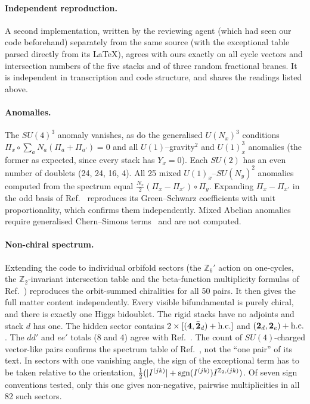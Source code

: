 \documentclass[aps,prd,twocolumn,superscriptaddress,nofootinbib,showkeys]{revtex4-2}
\begin{document}
\paragraph{Independent reproduction.} A second implementation, written by the reviewing agent (which had seen our code beforehand) separately from the same source (with the exceptional table parsed directly from its \LaTeX), agrees with ours exactly on all cycle vectors and intersection numbers of the five stacks and of three random fractional branes. It is independent in transcription and code structure, and shares the readings listed above.

\paragraph{Anomalies.} The $SU(4)^3$ anomaly vanishes, as do the generalised $U(N_x)^3$ conditions $\Pi_x\circ\sum_aN_a(\Pi_a+\Pi_{a'})=0$ and all $U(1)$--gravity$^2$ and $U(1)_x^3$ anomalies (the former as expected, since every stack has $Y_x=0$). Each $SU(2)$ has an even number of doublets (24, 24, 16, 4). All 25 mixed $U(1)_x$--$SU(N_y)^2$ anomalies computed from the spectrum equal $\tfrac{N_x}{2}(\Pi_x-\Pi_{x'})\circ\Pi_y$. Expanding $\Pi_x-\Pi_{x'}$ in the odd basis of Ref.~\cite{HRS} reproduces its Green--Schwarz coefficients with unit proportionality, which confirms them independently. Mixed Abelian anomalies require generalised Chern--Simons terms~\cite{ABDK} and are not computed.

\paragraph{Non-chiral spectrum.} Extending the code to individual orbifold sectors (the $\mathbb Z_6'$ action on one-cycles, the $\mathbb Z_2$-invariant intersection table and the beta-function multiplicity formulas of Ref.~\cite{HRS}) reproduces the orbit-summed chiralities for all 50 pairs. It then gives the full matter content independently. Every visible bifundamental is purely chiral, and there is exactly one Higgs bidoublet. The rigid stacks have no adjoints and stack $d$ has one. The hidden sector contains $2\times[(\mathbf4,\bar{\mathbf2}_d)+{\rm h.c.}]$ and $(\mathbf2_d,\mathbf2_e)+{\rm h.c.}$. The $dd'$ and $ee'$ totals (8 and 4) agree with Ref.~\cite{HRS}. The count of $SU(4)$-charged vector-like pairs confirms the spectrum table of Ref.~\cite{HRS}, not the ``one pair'' of its text. In sectors with one vanishing angle, the sign of the exceptional term has to be taken relative to the orientation, $\tfrac12(|I^{(jk)}|+{\rm sgn}(I^{(jk)})I^{\mathbb Z_2,(jk)})$. Of seven sign conventions tested, only this one gives non-negative, pairwise multiplicities in all 82 such sectors.
\end{document}
